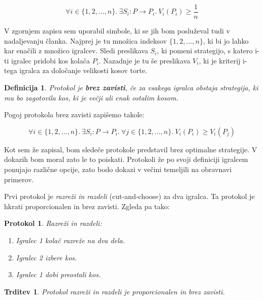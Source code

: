 \documentclass[a4paper, 12pt]{article}
\newtheorem{definicija}{Definicija}
\newtheorem{trditev}{Trditev}
\newtheorem{protokol}{Protokol}
\begin{document}
	$$
	\forall i \in \{1, 2, \ldots, n\}.\ \exists S_i: P \rightarrow P_i.\ V_i (P_i) \geq \frac{1}{n}
	$$
	
	V zgornjem zapisu sem uporabil simbole, ki se jih bom posluževal tudi v nadaljevanju članka. Najprej je tu množica indeksov $\{1, 2, \ldots, n\}$, ki bi jo lahko kar enačili z množico igralcev. Sledi preslikava $S_i$, ki pomeni strategijo, s katero i-ti igralec pridobi kos kolača $P_i$. Nazadnje je tu še preslikava $V_i$, ki je kriterij i-tega igralca za določanje velikosti kosov torte.

	\begin{definicija}
		Protokol je \textbf{brez zavisti}, če za vsakega igralca obstaja strategija, ki mu bo zagotovila kos, ki je večji ali enak ostalim kosom. 
	\end{definicija}

	Pogoj protokola brez zavisti zapišemo takole:
	
	$$
	\forall i \in \{1, 2, \ldots, n\}.\ \exists S_i: P \rightarrow P_i.\ \forall j \in \{1, 2, \ldots, n\}.\ V_i (P_i) \geq V_i (P_j)
	$$
	
	Kot sem že zapisal, bom sledeče protokole predstavil brez optimalne strategije. V dokazih bom moral zato le to poiskati. Protokoli že po svoji definiciji igralcem ponujajo različne opcije, zato bodo dokazi v večini temeljili na obravnavi primerov.
	
	Prvi protokol je \textit{razreži in razdeli} (cut-and-choose) za dva igralca. Ta protokol je hkrati proporcionalen in brez zavisti. Zgleda pa tako:
	
	\begin{protokol}
		
		Razreži in razdeli:
		
		\begin{enumerate}
			
			\item Igralec 1 kolač razreže na dva dela.
			
			\item Igralec 2 izbere kos.
			
			\item Igralec 1 dobi preostali kos.
			
		\end{enumerate}
	\end{protokol}
	
	\begin{trditev}
		Protokol razreži in razdeli je proporcionalen in brez zavisti.
	\end{trditev}
\end{document}

